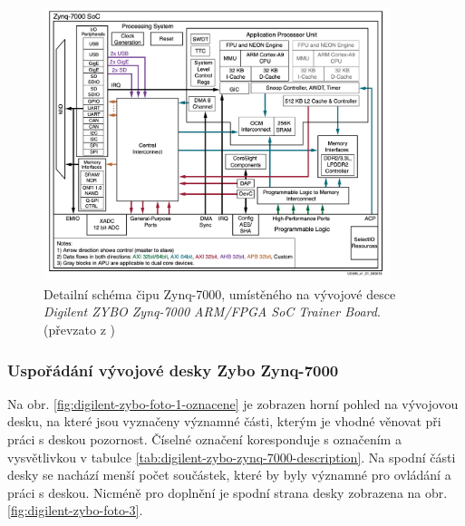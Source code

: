 \documentclass[a4paper, twoside, 11pt]{article}
\newcommand{\fbar}{\FloatBarrier}
\begin{document}
			\begin{figure}[htbp!]
				\centering
					\includegraphics[width=0.90\textwidth]{src/png/zynq-block-diagram-detailed.png} 
					\caption{Detailní schéma čipu Zynq-7000, umístěného na vývojové desce \textit{Digilent ZYBO Zynq-7000 ARM/FPGA SoC Trainer Board}. (převzato z \cite{xilinx-zynq-7000-technical-reference-manual})}
					\label{fig:zynq-block-diagram-detailed}
			\end{figure}
			\fbar
			\subsubsection{Uspořádání vývojové desky Zybo Zynq-7000}
				Na obr. \ref{fig:digilent-zybo-foto-1-oznacene} je zobrazen horní pohled na vývojovou desku, na které jsou vyznačeny významné části, kterým je vhodné věnovat při práci s deskou pozornost. Číselné označení koresponduje s označením a vysvětlivkou v tabulce \ref{tab:digilent-zybo-zynq-7000-description}. Na spodní části desky se nachází menší počet součástek, které by byly významné pro ovládání a práci s deskou. Nicméně pro doplnění je spodní strana desky zobrazena na obr. \ref{fig:digilent-zybo-foto-3}.
\end{document}
